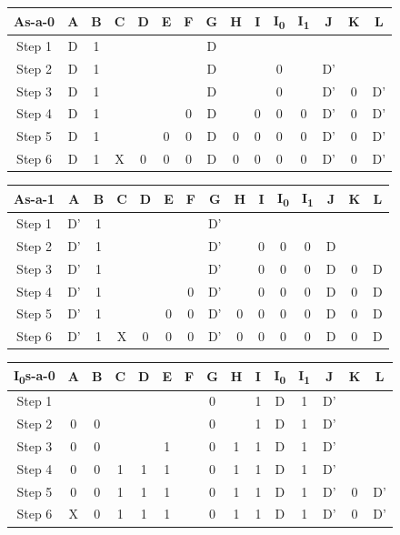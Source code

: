 \documentclass[11pt]{report}
\begin{document}
\begin{tabular}{ |c||c|c|c|c|c|c|c|c|c|c|c|c|c|c|}
\hline
\bf As-a-0 & \bf A & \bf B & \bf C & \bf D & \bf E & \bf F & G & H & I & I\textsubscript{0} & I\textsubscript{1} & J & K & \bf L \\
\hline
\hline
Step 1 & D & 1 & & & & & D & & & & & & & \\
\hline
Step 2 & D & 1 & & & & & D & & & 0 & & D' & & \\
\hline
Step 3 & D & 1 & & & & & D & & & 0 & & D' & 0 & D' \\
\hline
Step 4 & D & 1 & & & & 0 & D & & 0 & 0 & 0 & D' & 0 & D' \\
\hline
Step 5 & D & 1 & & & 0 & 0 & D & 0 & 0 & 0 & 0 & D' & 0 & D' \\
\hline
Step 6 & D & 1 & X & 0 & 0 & 0 & D & 0 & 0 & 0 & 0 & D' & 0 & D' \\
\hline
\end{tabular}


\begin{tabular}{ |c||c|c|c|c|c|c|c|c|c|c|c|c|c|c| }
\hline
\bf As-a-1 & \bf A & \bf B & \bf C & \bf D & \bf E & \bf F & G & H & I & I\textsubscript{0} & I\textsubscript{1} & J & K & \bf L \\
\hline
\hline
Step 1 & D' & 1 & & & & & D' & & & & & & & \\
\hline
Step 2 & D' & 1 & & & & & D' & & 0 & 0 & 0 & D & & \\
\hline
Step 3 & D' & 1 & & & & & D' & & 0 & 0 & 0 & D & 0 & D \\
\hline
Step 4 & D' & 1 & & & & 0 & D' & & 0 & 0 & 0 & D & 0 & D \\
\hline
Step 5 & D' & 1 & & & 0 & 0 & D' & 0 & 0 & 0 & 0 & D & 0 & D \\
\hline
Step 6 & D' & 1 & X & 0 & 0 & 0 & D' & 0 & 0 & 0 & 0 & D & 0 & D \\
\hline
\end{tabular}



\begin{tabular}{ |c||c|c|c|c|c|c|c|c|c|c|c|c|c|c| }
\hline
\bf I\textsubscript{0}s-a-0 & \bf A & \bf B & \bf C & \bf D & \bf E & \bf F & G & H & I & I\textsubscript{0} & I\textsubscript{1} & J & K & \bf L \\
\hline
\hline
Step 1 & & & & & & & 0 & & 1 & D & 1 & D' & & \\
\hline
Step 2 & 0 & 0 & & & & & 0 & & 1 & D & 1 & D' & & \\
\hline
Step 3 & 0 & 0 & & & 1 & & 0 & 1 & 1 & D & 1 & D' & & \\
\hline
Step 4 & 0 & 0 & 1 & 1 & 1 & & 0 & 1 & 1 & D & 1 & D' & & \\
\hline
Step 5 & 0 & 0 & 1 & 1 & 1 & & 0 & 1 & 1 & D & 1 & D' & 0 & D' \\
\hline
Step 6 & X & 0 & 1 & 1 & 1 & & 0 & 1 & 1 & D & \cellcolor{yellow!50}1 & D' & \cellcolor{yellow!50}0 & D' \\
\hline
\end{tabular}
\end{document}
